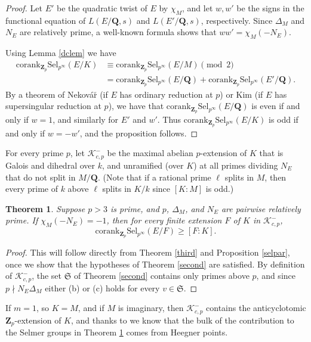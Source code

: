\documentclass[reqno]{amsart}
\newtheorem{thm}{Theorem}[section]
\theoremstyle{definition}
\def\Z{\mathbf{Z}}
\def\Q{\mathbf{Q}}
\def\Zp{\Z_p}
\def\K{\mathcal{K}}
\def\cork{\mathrm{corank}}
\def\Sel{\mathrm{Sel}}
\def\k{k}
\def\Kantip{\K^-_{c,p}}
\def\Sbad{\mathfrak{S}}
\begin{document}
\begin{proof}
Let $E'$ be the quadratic twist of $E$ by $\chi_M$, 
and let $w, w'$ be the signs in the functional equation of $L(E/\Q,s)$ 
and $L(E'/\Q,s)$, respectively.  Since $\Delta_M$ and $N_E$ 
are relatively prime, a well-known formula shows that $ww' = \chi_M(-N_E)$.  

Using Lemma \ref{dclem} we have 
\begin{align*}
\cork_{\Zp}\Sel_{p^\infty}(E/K) &\equiv \cork_{\Zp}\Sel_{p^\infty}(E/M) \pmod{2}\\
    &= \cork_{\Zp}\Sel_{p^\infty}(E/\Q) + \cork_{\Zp}\Sel_{p^\infty}(E'/\Q).
\end{align*}
By a theorem of Nekov\'a\u{r} \cite{nekovarpc} (if $E$ has ordinary reduction at $p$) 
or Kim \cite{kim} (if $E$ has supersingular reduction at $p$), 
we have that $\cork_{\Zp}\Sel_{p^\infty}(E/\Q)$ is even if and only if 
$w = 1$, and similarly for $E'$ and $w'$.  Thus $\cork_{\Zp}\Sel_{p^\infty}(E/K)$ 
is odd if and only if $w = -w'$, and the proposition follows.
\end{proof}

For every prime $p$, let $\Kantip$ be the maximal 
abelian $p$-extension of $K$ that is Galois and dihedral 
over $\k$, and unramified (over $K$) at all primes dividing $N_E$ that 
do not split in $M/\Q$.
(Note that if a rational prime $\ell$ splits in $M$, then every 
prime of $\k$ above $\ell$ splits in $K/\k$ since $[K:M]$ is odd.)

\begin{thm}
\label{dihex}
Suppose $p > 3$ is prime, and $p$, $\Delta_M$, and $N_E$ 
are pairwise relatively prime.  
If $\chi_M(-N_E) = -1$, 
then for every finite extension $F$ of $K$ in $\Kantip$, 
$$
\cork_{\Zp}\Sel_{p^\infty}(E/F) \ge [F:K].
$$
\end{thm}

\begin{proof}
This will follow directly from Theorem \ref{third} and Proposition \ref{selpar}, 
once we show that the hypotheses of Theorem \ref{second} are satisfied.   
By definition of $\Kantip$, the set $\Sbad$ of Theorem \ref{second} 
contains only primes above $p$, and since $p \nmid N_E \Delta_M$ either 
(b) or (c) holds for every $v \in \Sbad$.
\end{proof}

If $m = 1$, so $K = M$, and if $M$ is imaginary, then $\Kantip$ contains 
the anticyclotomic $\Zp$-extension of $K$, and thanks to \cite{cornut, vatsal} 
we know that the bulk of the contribution to the Selmer groups in 
Theorem \ref{dihex} comes from Heegner points.
\end{document}
